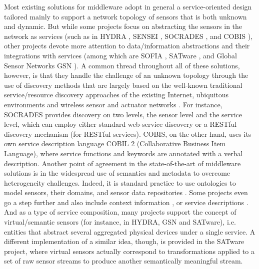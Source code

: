 Most existing solutions for middleware adopt in general a service-oriented design tailored mainly to support a network topology of sensors that is both unknown and dynamic. But while some projects focus on abstracting the sensors in the network as services (such as in HYDRA \cite{ZH09, ERA10, ZH08}, SENSEI \cite{PBEV09}, SOCRADES \cite{GTKSS10}, and COBIS \cite{cobis07}), other projects devote more attention to data/information abstractions and their integrations with services (among which are SOFIA \cite{HLBT10}, SATware \cite{MDMV09}, and Global Sensor Networks GSN \cite{AHS07}). A common thread throughout all of these solutions, however, is that they handle the challenge of an unknown topology through the use of discovery methods that are largely based on the well-known traditional service/resource discovery approaches of the existing Internet, ubiquitous environments and wireless sensor and actuator networks \cite{AM08, ZMN05, MRPM08}. For instance, SOCRADES provides discovery on two levels, the sensor level and the service level, which can employ either standard web-service discovery or a RESTful discovery mechanism (for RESTful services). COBIS, on the other hand, uses its own service description language COBIL 2 (Collaborative Business Item Language), where service functions and keywords are annotated with a verbal description.
Another point of agreement in the state-of-the-art of middleware solutions is in the widespread use of semantics and metadata to overcome heterogeneity challenges. Indeed, it is standard practice to use ontologies to model sensors, their domains, and sensor data repositories  \cite{ERA10, ELS07, LZ05}. Some projects even go a step further and also include context information \cite{PBEV09}, or service descriptions \cite{ZH09, ERA10, ZH08}. And as a type of service composition, many projects support the concept of virtual/semantic sensors (for instance, in HYDRA, GSN and SATware), i.e. entities that abstract several aggregated physical devices under a single service. A different implementation of a similar idea, though, is provided in the SATware project, where virtual sensors actually correspond to transformations applied to a set of raw sensor streams to produce another semantically meaningful stream.\\

